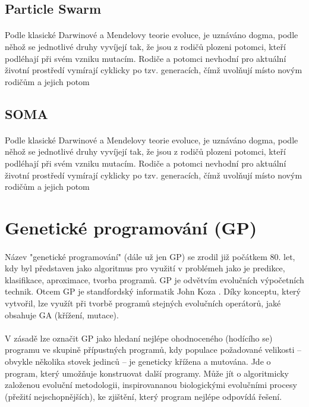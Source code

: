 \documentclass[bc,male,java,dept460]{diploma}		%
\begin{document}
\subsection{Particle Swarm}
\paragraph*{}
Podle klasické Darwinové a Mendelovy teorie evoluce, je uznáváno dogma, podle něhož se jednotlivé druhy vyvíjejí tak, že jsou z rodičů plozeni potomci, kteří podléhají při svém vzniku mutacím. Rodiče a potomci nevhodní pro aktuální životní prostředí vymírají cyklicky po tzv. generacích, čímž uvolňují místo novým rodičům a jejich potom

\subsection{SOMA}
\paragraph*{}
Podle klasické Darwinové a Mendelovy teorie evoluce, je uznáváno dogma, podle něhož se jednotlivé druhy vyvíjejí tak, že jsou z rodičů plozeni potomci, kteří podléhají při svém vzniku mutacím. Rodiče a potomci nevhodní pro aktuální životní prostředí vymírají cyklicky po tzv. generacích, čímž uvolňují místo novým rodičům a jejich potom

\section{Genetické programování (GP)}
\paragraph*{}
Název "genetické programování" (dále už jen GP) se zrodil již počátkem 80. let, kdy byl představen jako algoritmus pro využití v problémeh jako je predikce, klasifikace, aproximace, tvorba programů. GP je odvětvím evolučních výpočetních technik.
Otcem GP je standfordský informatik John Koza \cite{kozagp,kozagp2}. Díky konceptu, který vytvořil, lze využít při tvorbě programů stejných evolučních operátorů, jaké obsahuje GA (křížení, mutace).

\paragraph*{}
V zásadě lze označit GP jako hledaní nejlépe ohodnoceného (hodícího se) programu ve skupině přípustných programů, kdy populace požadované velikosti – obvykle několika stovek jedinců – je geneticky křížena a mutována.
Jde o program, který umožňuje konstruovat další programy. Může jít o algoritmicky založenou evoluční metodologii, inspirovananou biologickými evolučními procesy (přežití nejschopnějších), ke zjištění, který program nejlépe odpovídá řešení.
\end{document}
